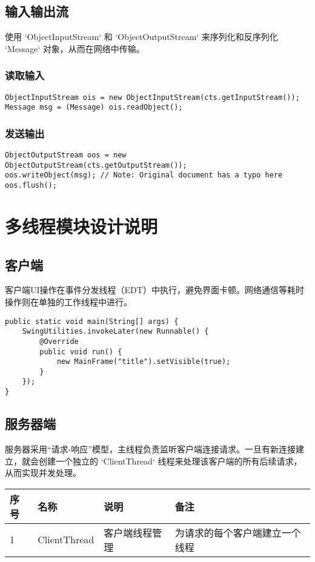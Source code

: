 \documentclass[a4paper]{ctexart}
\begin{document}
\subsection{输入输出流}
使用 `ObjectInputStream` 和 `ObjectOutputStream` 来序列化和反序列化 `Message` 对象，从而在网络中传输。

\subsubsection{读取输入}
\begin{lstlisting}
ObjectInputStream ois = new ObjectInputStream(cts.getInputStream());
Message msg = (Message) ois.readObject();
\end{lstlisting}

\subsubsection{发送输出}
\begin{lstlisting}
ObjectOutputStream oos = new ObjectOutputStream(cts.getOutputStream());
oos.writeObject(msg); // Note: Original document has a typo here
oos.flush();
\end{lstlisting}

\section{多线程模块设计说明}
\subsection{客户端}
客户端UI操作在事件分发线程（EDT）中执行，避免界面卡顿。网络通信等耗时操作则在单独的工作线程中进行。
\begin{lstlisting}
public static void main(String[] args) {
    SwingUtilities.invokeLater(new Runnable() {
        @Override
        public void run() {
            new MainFrame("title").setVisible(true);
        }
    });
}
\end{lstlisting}

\subsection{服务器端}
服务器采用“请求-响应”模型，主线程负责监听客户端连接请求。一旦有新连接建立，就会创建一个独立的 `ClientThread` 线程来处理该客户端的所有后续请求，从而实现并发处理。

\begin{tabular}{llll}
    \toprule
    \textbf{序号} & \textbf{名称}  & \textbf{说明} & \textbf{备注}     \\
    \midrule
    1           & ClientThread & 客户端线程管理     & 为请求的每个客户端建立一个线程 \\
    \bottomrule
\end{tabular}
\end{document}
